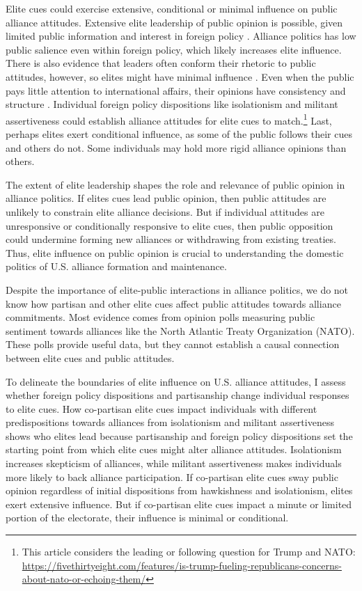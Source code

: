 \documentclass[12pt]{article}
\begin{document}
Elite cues could exercise extensive, conditional or minimal influence on public alliance attitudes. 
Extensive elite leadership of public opinion is possible, given limited public information and interest in foreign policy \citep{Canes-Wrone2006, BaumPotter2008, Druckman2014}.
Alliance politics has low public salience even within foreign policy, which likely increases elite influence. 
There is also evidence that leaders often conform their rhetoric to public attitudes, however, so elites might have minimal influence  \citep{Barberaetal2019, HagerHilbig2020}.
Even when the public pays little attention to international affairs, their opinions have consistency and structure \citep{Holsti1992, PageShapiro1992}.
Individual foreign policy dispositions like isolationism and militant assertiveness \citep{Herrmannetal1999, KertzerZeitzoff2017} could establish alliance attitudes for elite cues to match.\footnote{This article considers the leading or following question for Trump and NATO: \url{https://fivethirtyeight.com/features/is-trump-fueling-republicans-concerns-about-nato-or-echoing-them/}}
Last, perhaps elites exert conditional influence, as some of the public follows their cues and others do not. 
Some individuals may hold more rigid alliance opinions than others.


The extent of elite leadership shapes the role and relevance of public opinion in alliance politics.
If elites cues lead public opinion, then public attitudes are unlikely to constrain elite alliance decisions.
But if individual attitudes are unresponsive or conditionally responsive to elite cues, then public opposition could undermine forming new alliances or withdrawing from existing treaties. 
Thus, elite influence on public opinion is crucial to understanding the domestic politics of U.S. alliance formation and maintenance.  


Despite the importance of elite-public interactions in alliance politics, we do not know how partisan and other elite cues affect public attitudes towards alliance commitments. 
Most evidence comes from opinion polls measuring public sentiment towards alliances like the North Atlantic Treaty Organization (NATO).
These polls provide useful data, but they cannot establish a causal connection between elite cues and public attitudes.


To delineate the boundaries of elite influence on U.S. alliance attitudes, I assess whether foreign policy dispositions and partisanship change individual responses to elite cues.
How co-partisan elite cues impact individuals with different predispositions towards alliances from isolationism and militant assertiveness shows who elites lead because partisanship and foreign policy dispositions set the starting point from which elite cues might alter alliance attitudes. 
Isolationism increases skepticism of alliances, while militant assertiveness makes individuals more likely to back alliance participation. 
If co-partisan elite cues sway public opinion regardless of initial dispositions from hawkishness and isolationism, elites exert extensive influence. 
But if co-partisan elite cues impact a minute or limited portion of the electorate, their influence is minimal or conditional.
\end{document}
